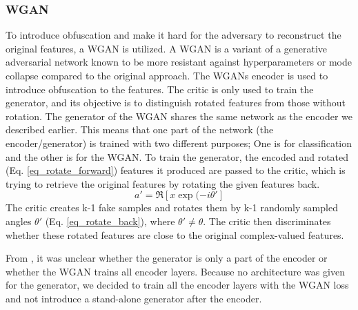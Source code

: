 \subsubsection{WGAN}
To introduce obfuscation and make it hard for the adversary to reconstruct the original features, a WGAN is utilized. A WGAN is a variant of a generative adversarial network known to be more resistant against hyperparameters or mode collapse compared to the original approach. The WGANs encoder is used to introduce obfuscation to the features. The critic is only used to train the generator, and its objective is to distinguish rotated features from those without rotation. The generator of the WGAN shares the same network as the encoder we described earlier. This means that one part of the network (the encoder/generator) is trained with two different purposes; One is for classification and the other is for the WGAN. To train the generator, the encoded and rotated (Eq. \ref{eq_rotate_forward}) features it produced are passed to the critic, which is trying to retrieve the original features by rotating the given features back. 
\begin{equation}
    a' = \Re[x \exp(-i\theta']
    \label{eq_rotate_back}
\end{equation}
The critic creates k-1 fake samples and rotates them by k-1 randomly sampled angles $\theta'$ (Eq. \ref{eq_rotate_back}), where $\theta'\neq\theta$. The critic then discriminates whether these rotated features are close to the original complex-valued features.

From  \cite{xiang2020interpretable}, it was unclear whether the generator is only a part of the encoder or whether the WGAN trains all encoder layers. Because no architecture was given for the generator, we decided to train all the encoder layers with the WGAN loss and not introduce a stand-alone generator after the encoder.


